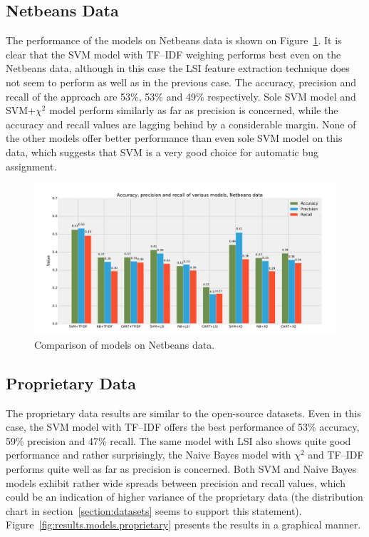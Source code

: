 \subsection{Netbeans Data}

The performance of the models on Netbeans data is shown on Figure~\ref{fig:results.models.netbeans}. It is clear that the SVM model with TF--IDF weighing performs best even on the Netbeans data, although in this case the LSI feature extraction technique does not seem to perform as well as in the previous case. The accuracy, precision and recall of the approach are 53\%, 53\% and 49\% respectively. Sole SVM model and SVM+$\chi^2$ model perform similarly as far as precision is concerned, while the accuracy and recall values are lagging behind by a considerable margin. None of the other models offer better performance than even sole SVM model on this data, which suggests that SVM is a very good choice for automatic bug assignment.

\begin{figure}[htbp]
    \centering
        \includegraphics[width=\textwidth]{./images/comparison_of_models/netbeans.pdf}
    \caption{Comparison of models on Netbeans data.}
    \label{fig:results.models.netbeans}
\end{figure}

\subsection{Proprietary Data}

The proprietary data results are similar to the open-source datasets. Even in this case, the SVM model with TF--IDF offers the best performance of 53\% accuracy, 59\% precision and 47\% recall. The same model with LSI also shows quite good performance and rather surprisingly, the Naive Bayes model with $\chi^2$ and TF--IDF performs quite well as far as precision is concerned. Both SVM and Naive Bayes models exhibit rather wide spreads between precision and recall values, which could be an indication of higher variance of the proprietary data (the distribution chart in section~\ref{section:datasets} seems to support this statement). Figure~\ref{fig:results.models.proprietary} presents the results in a graphical manner.

